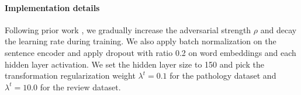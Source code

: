 




\paragraph{Implementation details}
Following prior work \cite{ganin2014unsupervised}, we gradually increase the adversarial strength $\rho$ and decay the learning rate during training. We also apply batch normalization \cite{ioffe2015batch} on the sentence encoder and apply dropout with ratio 0.2 on word embeddings and each hidden layer activation. We set the hidden layer size to 150 and pick the transformation regularization weight $\lambda^{t}=0.1$ for the pathology dataset and $\lambda^{t}=10.0$ for the review dataset. 
